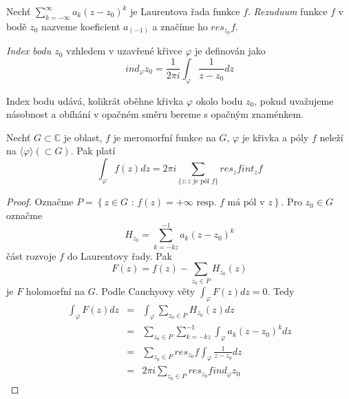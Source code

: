 \begin{definice}
Nechť $\sum_{k =- \infty}^\infty a_k ( z-z_0)^k$ je Laurentova řada funkce $f$. \emph{Rezuduum} funkce $f$ v bodě $z_0$ nazveme koeficient $a_{(-1)}$ a značíme ho $res_{z_0} f$.
\end{definice}

\begin{definice}
\emph{Index bodu $z_0$} vzhledem v uzavřené křivce $\varphi$ je definován jako
$$ind_\varphi z_0 = \frac{1}{2 \pi i} \int_\varphi \frac{1}{z-z_0}dz$$
\end{definice}

Index bodu udává, kolikrát oběhne křivka $\varphi$ okolo bodu $z_0$, pokud uvažujeme násobnost a obíhání v opačném směru bereme s opačným znaménkem.

\begin{vetat}
Nechť $G \subset \mathbb{C}$ je oblast, $f$ je meromorfní funkce na $G$, $\varphi$ je křivka a póly $f$ neleží na $\langle \varphi \rangle (\subset G)$. Pak platí
$$\int_\varphi f(z) dz = 2 \pi i \sum_{\{z: z \textrm{ je pól } f\}} res_z f int_z f$$
\end{vetat}

\begin{proof}
Označme $P = \left\{ z \in G \textrm{ : } f(z)=+\infty \textrm{ resp. $f$ má pól v $z$} \right\}$. 
Pro $z_0 \in G$ označme 
$$H_{z_0} = \sum_{k = -kz}^{-1} a_k (z-z_0)^k$$ 
část rozvoje $f$ do Laurentovy řady.
Pak $$F(z) = f(z) - \sum_{z_0 \in P} H_{z_0}(z)$$ je $F$ holomorfní na $G$.
Podle Cauchyovy věty $\int_\varphi F(z) dz = 0$. Tedy
\begin{eqnarray}
\int_\varphi F(z) dz & = & \int_\varphi \sum_{z_0 \in P} H_{z_0}(z) dz \nonumber\\
& = & \sum_{z_0 \in P} \sum_{k=-kz}^{-1} \int_\varphi a_k (z-z_0)^k dz \nonumber\\
& = & \sum_{z_0 \in P} res_{z_0} f \int_\varphi \frac{1}{z-z_0} dz \nonumber\\
& = & 2 \pi i \sum_{z_0 \in P} res_{z_0} f ind_\varphi z_0 \nonumber
\end{eqnarray}
\end{proof}